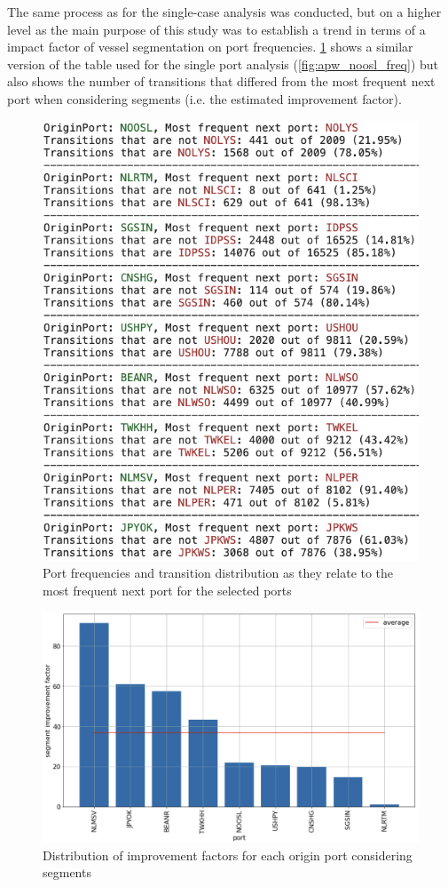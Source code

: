 The same process as for the single-case analysis was conducted, but on a higher level as the main purpose of this study was to establish a trend in terms of a impact factor of vessel segmentation on port frequencies. \cref{fig:trend_freq} shows a similar version of the table used for the single port analysis (\cref{fig:apw_noosl_freq}) but also shows the number of transitions that differed from the most frequent next port when considering segments (i.e. the estimated improvement factor).

\begin{figure}[htbp]
    \centering
    \includegraphics[width=.56\textwidth]{figures/apw/trend_frequency.png}
    \caption{Port frequencies and transition distribution as they relate to the most frequent next port for the selected ports}
    \label{fig:trend_freq}
\end{figure}

\begin{figure}[htbp]
    \centering
    \includegraphics[width=.9\textwidth]{figures/apw/segment_improvement.png}
    \caption{Distribution of improvement factors for each origin port considering segments}
    \label{fig:segment_improvment}
\end{figure}


